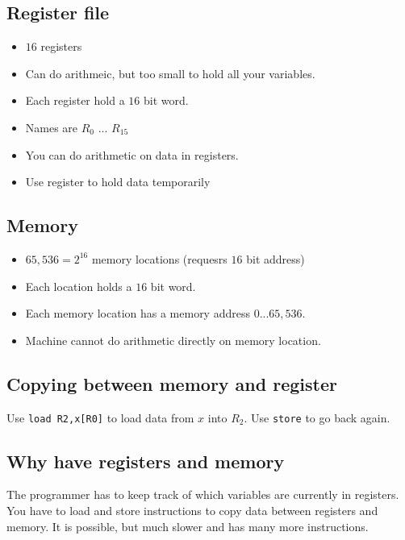 \subsection{Register file}\label{sub:register_file_one}

\begin{itemize}
    \item \(16\) registers
    \item Can do arithmeic, but too small to hold all your variables.
    \item Each register hold a \(16\) bit word.
    \item Names are \(R_0\) ...  \(R_{15}\)
    \item You can do arithmetic on data in registers.
    \item Use register to hold data temporarily
\end{itemize}

\subsection{Memory}\label{sub:memory}

\begin{itemize}
    \item \(65,536 = 2^{16}\) memory locations (requesrs \(16\) bit address)
    \item Each location holds a \(16\) bit word.
    \item Each memory location has a memory address \(0\)...\(65,536\).
    \item Machine cannot do arithmetic directly on memory location.
\end{itemize}


\subsection{Copying between memory and register}\label{sub:copying_between_memory_and_register}

Use \texttt{load R2,x[R0]}  to load data from \(x\) into \(R_2\).
Use \texttt{store} to go back again.


\subsection{Why have registers and memory}\label{sub:why_have_registers_and_memory}

The programmer has to keep track of which variables are currently in registers.
You have to load and store instructions to copy data between registers and memory.
It is possible, but much slower and has many more instructions.

